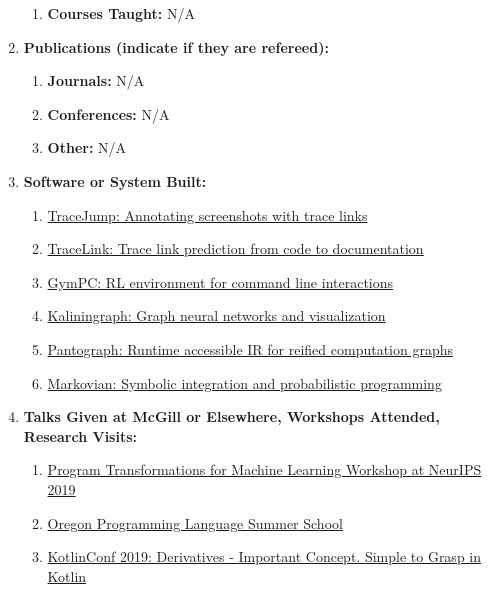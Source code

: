\documentclass[11pt]{article}
\begin{document}
\begin{enumerate}
\begin{enumerate}
            \item \textbf{Courses Taught:} N/A

        \end{enumerate}

        \item \textbf{Publications (indicate if they are refereed):}
        \begin{enumerate}
            \item \textbf{Journals:} N/A

            \item \textbf{Conferences:} N/A

            \item \textbf{Other:} N/A

        \end{enumerate}

        \item \textbf{Software or System Built:}

        \begin{enumerate}
            \item \href{https://github.com/acejump/tracejump}{TraceJump: Annotating screenshots with trace links}
            \item \href{https://github.com/breandan/tracelink}{TraceLink: Trace link prediction from code to documentation}
            \item \href{https://github.com/breandan/gym-pc}{GymPC: RL environment for command line interactions}
            \item \href{https://github.com/breandan/kaliningraph}{Kaliningraph: Graph neural networks and visualization}
            \item \href{https://github.com/breandan/pantograph}{Pantograph: Runtime accessible IR for reified computation graphs}
            \item \href{https://github.com/breandan/markovian}{Markovian: Symbolic integration and probabilistic programming}
        \end{enumerate}

        \item \textbf{Talks Given at McGill or Elsewhere, Workshops Attended, Research Visits:}

        \begin{enumerate}
            \item \href{https://program-transformations.github.io/}{Program Transformations for Machine Learning Workshop at NeurIPS 2019}
            \item \href{https://www.cs.uoregon.edu/research/summerschool/summer19/topics.php}{Oregon Programming Language Summer School}
            \item \href{https://kotlinconf.com/2019/talks/}{KotlinConf 2019: Derivatives - Important Concept. Simple to Grasp in Kotlin}
        \end{enumerate}


\end{enumerate}
\end{document}
